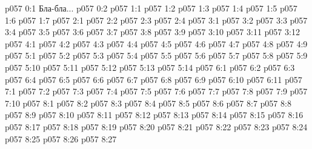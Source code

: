 \author{Носитель Жизни}
\vs p057 0:1  Бла-бла...
\vs p057 0:2 
\vs p057 1:1 
\vs p057 1:2 
\vs p057 1:3 \pc 
\vs p057 1:4 \pc 
\vs p057 1:5 
\vs p057 1:6 \pc 
\vs p057 1:7 
\vs p057 2:1 
\vs p057 2:2 \pc 
\vs p057 2:3 \pc 
\vs p057 2:4 \pc 
{}
\vs p057 3:1 
\vs p057 3:2 
\vs p057 3:3 
\vs p057 3:4 
\vs p057 3:5 
\vs p057 3:6 \pc 
\vs p057 3:7 \pc 
\vs p057 3:8 
\vs p057 3:9 \pc 
\vs p057 3:10 \pc 
\vs p057 3:11 
\vs p057 3:12 \pc 
{}
\vs p057 4:1 
\vs p057 4:2 \pc 
\vs p057 4:3 \pc 
\vs p057 4:4 \pc 
\vs p057 4:5 \pc 
\vs p057 4:6 \pc 
\vs p057 4:7 \pc 
\vs p057 4:8 \pc 
\vs p057 4:9 
\vs p057 5:1 
\vs p057 5:2 
\vs p057 5:3 
\vs p057 5:4 \pc 
\vs p057 5:5 
\vs p057 5:6 
\vs p057 5:7 
\vs p057 5:8 
\vs p057 5:9 
\vs p057 5:10 
\vs p057 5:11 
\vs p057 5:12 
\vs p057 5:13 \pc 
\vs p057 5:14 
\vs p057 6:1 
\vs p057 6:2 \pc 
\vs p057 6:3 
\vs p057 6:4 
\vs p057 6:5 
\vs p057 6:6 \pc 
\vs p057 6:7 \pc 
\vs p057 6:8 \pc 
\vs p057 6:9 
\vs p057 6:10 \pc 
\vs p057 6:11 
\vs p057 7:1 
\vs p057 7:2 \pc 
\vs p057 7:3 
\vs p057 7:4 \pc 
\vs p057 7:5 
\vs p057 7:6 \pc 
\vs p057 7:7 \pc 
\vs p057 7:8 
\vs p057 7:9 
\vs p057 7:10 
\vs p057 8:1 
\vs p057 8:2 
\vs p057 8:3 
\vs p057 8:4 
\vs p057 8:5 \pc 
\vs p057 8:6 
\vs p057 8:7 \pc 
\vs p057 8:8 
\vs p057 8:9 
\vs p057 8:10 
\vs p057 8:11 \pc 
\vs p057 8:12 
\vs p057 8:13 
\vs p057 8:14 
\vs p057 8:15 
\vs p057 8:16 \pc 
\vs p057 8:17 
\vs p057 8:18 
\vs p057 8:19 \pc 
\vs p057 8:20 
\vs p057 8:21 
\vs p057 8:22 
\vs p057 8:23 \pc 
\vs p057 8:24 \pc 
\vs p057 8:25 \pc 
\vs p057 8:26 
\vsetoff
\vs p057 8:27 
\quizlink
